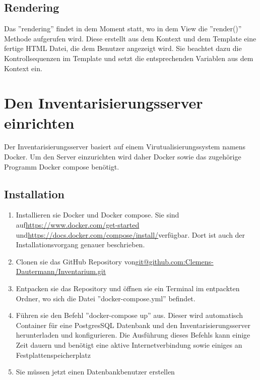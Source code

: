 \documentclass{article}
\begin{document}
\subsection{Rendering}
Das ''rendering'' findet in dem Moment statt, wo in dem View die ''render()'' Methode aufgerufen wird. Diese erstellt aus dem Kontext und dem Template eine fertige HTML Datei, die dem Benutzer angezeigt wird. Sie beachtet dazu die Kontrollsequenzen im Template und setzt die entsprechenden Variablen aus dem Kontext ein.

\section{Den Inventarisierungsserver einrichten}
Der Inventarisierungsserver basiert auf einem Virutualisierungssystem namens Docker. Um den Server einzurichten wird daher Docker sowie das zugehörige Programm Docker compose benötigt.
\subsection{Installation}
\begin{enumerate}
	\item Installieren sie Docker und Docker compose. Sie sind auf\newline \url{https://www.docker.com/get-started} und\newline \url{https://docs.docker.com/compose/install/}\newline verfügbar. Dort ist auch der Installationsvorgang genauer beschrieben. 
	\item Clonen sie das GitHub Repository von\newline \url{git@github.com:Clemens-Dautermann/Inventarium.git}
	\item Entpacken sie das Repository und öffnen sie ein Terminal im entpackten Ordner, wo sich die Datei ''docker-compose.yml'' befindet.
	\item Führen sie den Befehl ''docker-compose up'' aus. Dieser wird automatisch Container für eine PostgresSQL Datenbank und den Inventarisierungsserver herunterladen und konfigurieren. Die Ausführung dieses Befehls kann einige Zeit dauern und benötigt eine aktive Internetverbindung sowie einiges an Festplattenspeicherplatz
	\item Sie müssen jetzt einen Datenbankbenutzer erstellen
\end{enumerate}
\end{document}
